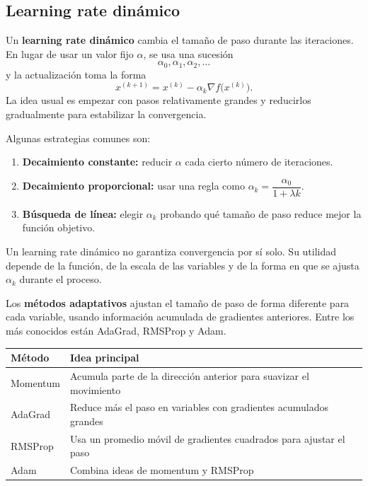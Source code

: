 \documentclass[a4,11pt]{aleph-notas}
\begin{document}
\subsection{Learning rate dinámico}

\begin{defi}
    Un \textbf{learning rate dinámico} cambia el tamaño de paso durante las iteraciones. En lugar de usar un valor fijo $\alpha$, se usa una sucesión
    \[
        \alpha_0,\alpha_1,\alpha_2,\ldots
    \]
    y la actualización toma la forma
    \[
        {x}^{(k+1)}
        =
        {x}^{(k)}
        -
        \alpha_k \nabla f\bigl({x}^{(k)}\bigr).
    \]
    La idea usual es empezar con pasos relativamente grandes y reducirlos gradualmente para estabilizar la convergencia.
\end{defi}

Algunas estrategias comunes son:
\begin{enumerate}
    \item \textbf{Decaimiento constante:} reducir $\alpha$ cada cierto número de iteraciones.
    \item \textbf{Decaimiento proporcional:} usar una regla como $\alpha_k=\dfrac{\alpha_0}{1+\lambda k}$.
    \item \textbf{Búsqueda de línea:} elegir $\alpha_k$ probando qué tamaño de paso reduce mejor la función objetivo.
\end{enumerate}

\begin{advertencia}
    Un learning rate dinámico no garantiza convergencia por sí solo. Su utilidad depende de la función, de la escala de las variables y de la forma en que se ajusta $\alpha_k$ durante el proceso.
\end{advertencia}

\begin{defi}
    Los \textbf{métodos adaptativos} ajustan el tamaño de paso de forma diferente para cada variable, usando información acumulada de gradientes anteriores. Entre los más conocidos están AdaGrad, RMSProp y Adam.
\end{defi}

\begin{center}
\small
\begin{tabular}{p{}p{}}
\toprule
Método & Idea principal \\
\midrule
Momentum & Acumula parte de la dirección anterior para suavizar el movimiento \\
AdaGrad & Reduce más el paso en variables con gradientes acumulados grandes \\
RMSProp & Usa un promedio móvil de gradientes cuadrados para ajustar el paso \\
Adam & Combina ideas de momentum y RMSProp \\
\bottomrule
\end{tabular}
\end{center}
\end{document}

